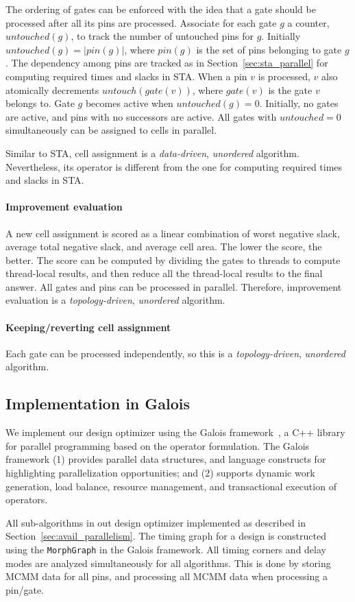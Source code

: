 The ordering of gates can be enforced with the idea that a gate should be processed after all its pins are processed. Associate for each gate $g$ a counter, $untouched(g)$, to track the number of untouched pins for $g$. Initially $untouched(g) = |pin(g)|$, where $pin(g)$ is the set of pins belonging to gate $g$. The dependency among pins are tracked as in Section~\ref{sec:sta_parallel} for computing required times and slacks in STA. When a pin $v$ is processed, $v$ also atomically decrements $untouch(gate(v))$, where $gate(v)$ is the gate $v$ belongs to. Gate $g$ becomes active when $untouched(g) = 0$. Initially, no gates are active, and pins with no successors are active. All gates with $untouched = 0$ simultaneously can be assigned to cells in parallel.

Similar to STA, cell assignment is a {\em data-driven}, {\em unordered} algorithm. Nevertheless, its operator is different from the one for computing required times and slacks in STA.

\paragraph{Improvement evaluation} A new cell assignment is scored as a linear combination of worst negative slack, average total negative slack, and average cell area. The lower the score, the better. The score can be computed by dividing the gates to threads to compute thread-local results, and then reduce all the thread-local results to the final answer. All gates and pins can be processed in parallel. Therefore, improvement evaluation is a {\em topology-driven}, {\em unordered} algorithm. 

\paragraph{Keeping/reverting cell assignment} Each gate can be processed independently, so this is a {\em topology-driven}, {\em unordered} algorithm.

\subsection{Implementation in Galois}

We implement our design optimizer using the Galois framework~\cite{nguyen:2013,Lenharth:2016}, a C++ library for parallel programming based on the operator formulation. The Galois framework (1) provides parallel data structures, and language constructs for highlighting parallelization opportunities; and (2) supports dynamic work generation, load balance, resource management, and transactional execution of operators.

All sub-algorithms in out design optimizer implemented as described in Section~\ref{sec:avail_parallelism}. The timing graph for a design is constructed using the {\tt MorphGraph} in the Galois framework. All timing corners and delay modes are analyzed simultaneously for all algorithms. This is done by storing MCMM data for all pins, and processing all MCMM data when processing a pin/gate.
